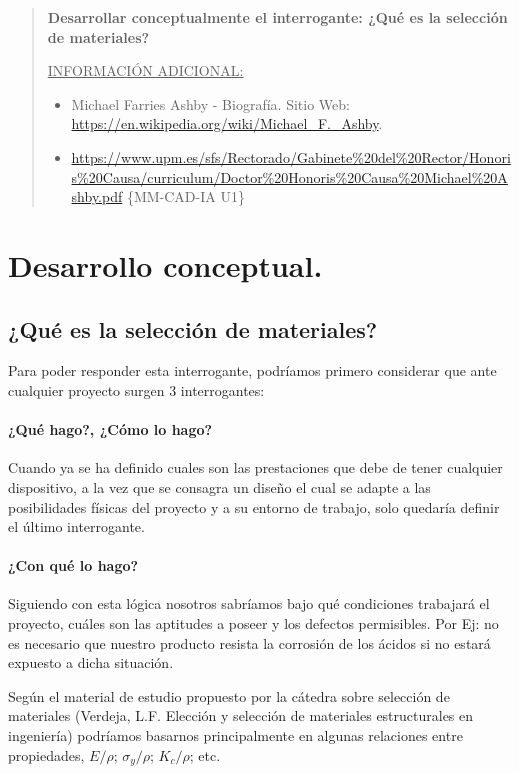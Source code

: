 \documentclass[12pt,a4paper]{article}
\begin{document}

\newpage
\tableofcontents

\begin{abstract}
    \textbf{Desarrollar conceptualmente el interrogante: ¿Qué es la selección de materiales?}

    \underline{INFORMACIÓN ADICIONAL:}
    \begin{itemize}
        \item Michael Farries Ashby - Biografía. Sitio Web: \url{https://en.wikipedia.org/wiki/Michael_F._Ashby}.
        \item \url{https://www.upm.es/sfs/Rectorado/Gabinete%20del%20Rector/Honoris%20Causa/curriculum/Doctor%20Honoris%20Causa%20Michael%20Ashby.pdf} \{MM-CAD-IA U1\}
    \end{itemize}
\end{abstract}

\section{Desarrollo conceptual.}
\subsection{¿Qué es la selección de materiales?}

Para poder responder esta interrogante, podríamos primero considerar que ante 
cualquier proyecto surgen 3 interrogantes: 
\paragraph{¿Qué hago?, ¿Cómo lo hago?} Cuando ya se ha definido cuales son las prestaciones que debe de tener cualquier dispositivo, a la vez que se consagra un diseño el cual se adapte a las posibilidades físicas del proyecto y a su entorno de trabajo, solo quedaría definir el último interrogante.
\paragraph{¿Con qué lo hago?} Siguiendo con esta lógica nosotros sabríamos bajo qué condiciones trabajará el proyecto, cuáles son las aptitudes a poseer y los defectos permisibles. Por Ej: no es necesario que nuestro producto resista la corrosión de los ácidos si no estará expuesto a dicha situación. 

Según el material de estudio propuesto por la cátedra sobre selección de materiales (Verdeja, L.F.  Elección y selección de materiales estructurales en ingeniería) podríamos basarnos principalmente en algunas relaciones entre propiedades, \(E/\rho\); \(\sigma_y/\rho\); \(K_c/\rho\); etc.
\end{document}
